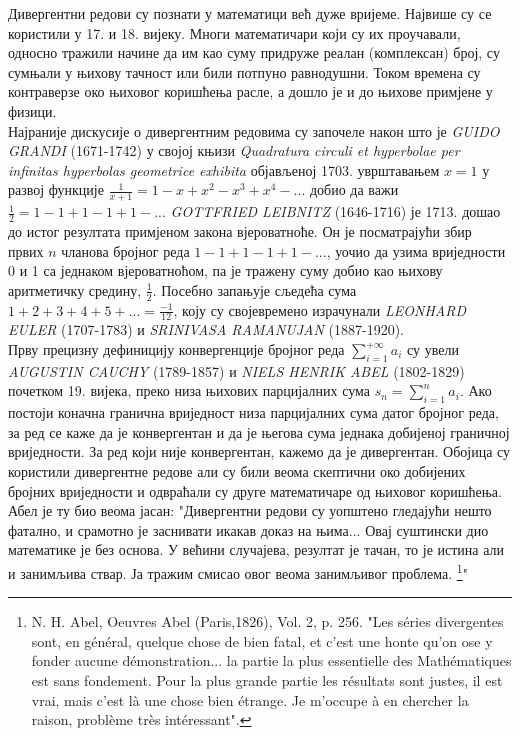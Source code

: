 \documentclass[12pt]{article}
\begin{document}
Дивергентни редови су познати у математици већ дуже вријеме. Највише су се користили у 17. и 18. вијеку. Многи математичари који су их проучавали, односно тражили начине да им као суму придруже реалан (комплексан) број, су сумњали у њихову тачност или били потпуно равнодушни. Током времена су контраверзе око њиховог коришћења расле, а дошло је и до њихове примјене у физици. \\
Најраније дискусије о дивергентним редовима су започеле након што је {\it GUIDO GRANDI} (1671-1742) у својој књизи {\it Quadratura circuli et hyperbolae per infinitas hyperbolas geometrice exhibita} објављеној 1703. уврштавањем $x=1$ у развој функције $\frac{1}{x+1}=1-x+x^2-x^3+x^4-...$ добио да важи $\frac{1}{2}=1-1+1-1+1-...$ {\it GOTTFRIED LEIBNITZ} (1646-1716) је 1713. дошао до истог резултата примјеном закона вјероватноће. Он је посматрајући збир првих $n$ чланова бројног реда $1-1+1-1+1-...$, уочио да узима вриједности 0 и 1 са једнаком вјероватноћом, па је тражену суму добио као њихову аритметичку средину, $\frac{1}{2}$. Посебно запањује сљедећа сума $1+2+3+4+5+...=\frac{-1}{12}$, коју су својевремено израчунали {\it LEONHARD EULER} (1707-1783) и {\it SRINIVASA RAMANUJAN} (1887-1920).\\
Прву прецизну дефиницију конвергенције бројног реда $\sum_{i=1}^{+\infty}a_i$ су увели {\it AUGUSTIN CAUCHY} (1789-1857) и {\it NIELS HENRIK ABEL} (1802-1829) почетком 19. вијека, преко низа њихових парцијалних сума $s_n=\sum_{i=1}^{n}a_i$. Ако постоји коначна гранична вриједност низа парцијалних сума датог бројног реда, за ред се каже да је конвергентан и да је његова сума једнака добијеној граничној вриједности. За ред који није конвергентан, кажемо да је дивергентан. Обојица су користили дивергентне редове али су били веома скептични око добијених бројних вриједности и одвраћали су друге математичаре од њиховог коришћења. Абел је ту био веома јасан: "Дивергентни редови су уопштено гледајући нешто фатално, и срамотно је заснивати икакав доказ на њима... Овај суштински дио математике је без основа. У већини случајева, резултат је тачан, то је истина али и занимљива ствар. Ја тражим смисао овог веома занимљивог проблема. \footnote{N. H. Abel, Oeuvres Abel (Paris,1826), Vol. 2, p. 256. "Les séries divergentes sont, en général, quelque chose de bien fatal, et c'est une honte qu'on ose y fonder aucune démonstration... la partie la plus essentielle des Mathématiques est sans fondement. Pour la plus grande partie les résultats sont justes, il est vrai, mais c'est là une chose bien étrange. Je m'occupe à en chercher la raison, problème très intéressant".}" \\
\end{document}

